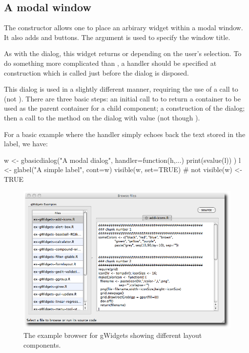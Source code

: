 \subsection{A modal window}
\label{sec:modal-window}


The  constructor allows one to place an
arbirary widget within a modal window. It also adds  and
 buttons. The argument  is
used to specify the window title. 



As with the  dialog, this widget returns
 or  depending on the user's selection. To do
something more complicated than , a handler should be
specified at construction which is called just before the dialog is
disposed.


This dialog is used in a slightly different manner, requiring the use
of a call to  (not ).
There are three basic steps: an initial call to
 to return a container to be used as the parent
container for a child component; a construction of the dialog; then a
call to the  method on the dialog with 
value (not though ).

For a basic example where the handler simply echoes back
the text stored in the label, we have:
\begin{Schunk}
\begin{Sinput}
 w <- gbasicdialog("A modal dialog", handler=function(h,...) {
   print(svalue(l))                      
 })
 l <- glabel("A simple label", cont=w)
 visible(w, set=TRUE)                 # not visible(w) <- TRUE
\end{Sinput}
\end{Schunk}


\begin{figure}
  \centering
  \includegraphics[width=.8\textwidth]{fig-gWidgets-example-browser}
  \caption{The example browser for gWidgets showing different layout components.}
  \label{fig:gWidgets-sample-layout}
\end{figure}




